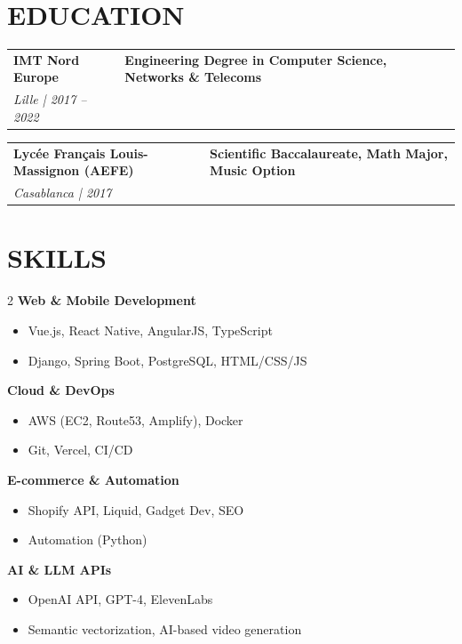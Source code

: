 \documentclass[a4paper,11pt]{article}
\begin{document}
\vspace{0.3cm}

\section{EDUCATION}

\begin{tabularx}{\textwidth}{@{}l X@{}}
\textbf{IMT Nord Europe} & \textbf{Engineering Degree in Computer Science, Networks \& Telecoms} \\
\textit{Lille | 2017 – 2022} & \\
\end{tabularx}

\vspace{0.1cm}

\begin{tabularx}{\textwidth}{@{}l X@{}}
\textbf{Lycée Français Louis-Massignon (AEFE)} & \textbf{Scientific Baccalaureate, Math Major, Music Option} \\
\textit{Casablanca | 2017} & \\
\end{tabularx}

\newpage

\section{SKILLS}

\begin{multicols}{2}
\textbf{Web \& Mobile Development}
\begin{itemize}[nosep]
    \item Vue.js, React Native, AngularJS, TypeScript
    \item Django, Spring Boot, PostgreSQL, HTML/CSS/JS
\end{itemize}

\textbf{Cloud \& DevOps}
\begin{itemize}[nosep]
    \item AWS (EC2, Route53, Amplify), Docker
    \item Git, Vercel, CI/CD
\end{itemize}

\columnbreak

\textbf{E-commerce \& Automation}
\begin{itemize}[nosep]
    \item Shopify API, Liquid, Gadget Dev, SEO
    \item Automation (Python)
\end{itemize}

\textbf{AI \& LLM APIs}
\begin{itemize}[nosep]
    \item OpenAI API, GPT-4, ElevenLabs
    \item Semantic vectorization, AI-based video generation
\end{itemize}
\end{multicols}
\end{document}
